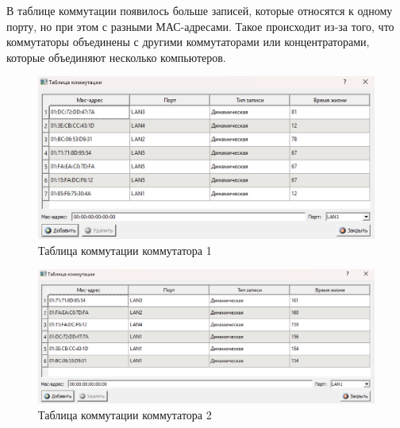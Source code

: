 \documentclass[12pt,onecolumn]{article}
\begin{document}
В таблице коммутации появилось больше записей, которые относятся к одному порту, но при этом с разными МАС-адресами. Такое происходит из-за того, что коммутаторы
объединены с другими коммутаторами или концентраторами, которые объединяют
несколько компьютеров.

\begin{figure}[H]
  \centering
  \includegraphics[width=\textwidth]{image/part3/switch-table-1.png}
  \caption{Таблица коммутации коммутатора 1}
\end{figure}
\begin{figure}[H]
  \centering
  \includegraphics[width=\textwidth]{image/part3/switch-table-2.png}
  \caption{Таблица коммутации коммутатора 2}
\end{figure}
\end{document}
